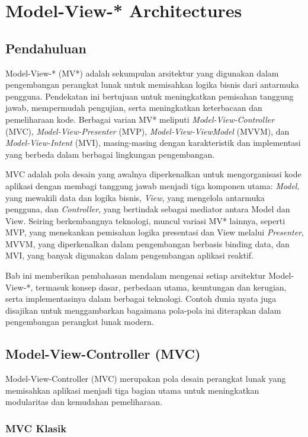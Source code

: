 \chapter{Model-View-* Architectures}

\section{Pendahuluan}

Model-View-* (MV*) adalah sekumpulan arsitektur yang digunakan dalam pengembangan perangkat lunak untuk memisahkan logika bisnis dari antarmuka pengguna. Pendekatan ini bertujuan untuk meningkatkan pemisahan tanggung jawab, mempermudah pengujian, serta meningkatkan keterbacaan dan pemeliharaan kode. Berbagai varian MV* meliputi \textit{Model-View-Controller} (MVC), \textit{Model-View-Presenter} (MVP), \textit{Model-View-ViewModel} (MVVM), dan \textit{Model-View-Intent} (MVI), masing-masing dengan karakteristik dan implementasi yang berbeda dalam berbagai lingkungan pengembangan.

MVC adalah pola desain yang awalnya diperkenalkan untuk mengorganisasi kode aplikasi dengan membagi tanggung jawab menjadi tiga komponen utama: \textit{Model}, yang mewakili data dan logika bisnis, \textit{View}, yang mengelola antarmuka pengguna, dan \textit{Controller}, yang bertindak sebagai mediator antara Model dan View. Seiring berkembangnya teknologi, muncul variasi MV* lainnya, seperti MVP, yang menekankan pemisahan logika presentasi dan View melalui \textit{Presenter}, MVVM, yang diperkenalkan dalam pengembangan berbasis binding data, dan MVI, yang banyak digunakan dalam pengembangan aplikasi reaktif.

Bab ini memberikan pembahasan mendalam mengenai setiap arsitektur Model-View-*, termasuk konsep dasar, perbedaan utama, keuntungan dan kerugian, serta implementasinya dalam berbagai teknologi. Contoh dunia nyata juga disajikan untuk menggambarkan bagaimana pola-pola ini diterapkan dalam pengembangan perangkat lunak modern.

\section{Model-View-Controller (MVC)}

Model-View-Controller (MVC) merupakan pola desain perangkat lunak yang memisahkan aplikasi menjadi tiga bagian utama untuk meningkatkan modularitas dan kemudahan pemeliharaan.

\subsection{MVC Klasik}

